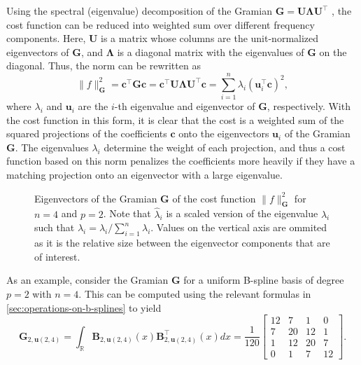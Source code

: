 Using the spectral (eigenvalue) decomposition of the Gramian $\mathbf G = \mathbf U \mathbf \Lambda \mathbf U^\top$ \citep{horn2013positive}, the cost function can be reduced into weighted sum over different frequency components. Here, $\mathbf U$ is a matrix whose columns are the unit-normalized eigenvectors of $\mathbf G$, and $\mathbf \Lambda$ is a diagonal matrix with the eigenvalues of $\mathbf G$ on the diagonal. Thus, the norm can be rewritten as
\begin{equation}\label{eq:cost-function-spectral-decomposition}
    \|f\|_\mathbf G^2 = \mathbf c^\top \mathbf G \mathbf c = \mathbf c^\top \mathbf U \mathbf \Lambda \mathbf U^\top \mathbf c = \sum_{i=1}^{n} \lambda_i (\mathbf u_i^\top \mathbf c)^2,
\end{equation}
where $\lambda_i$ and $\mathbf u_i$ are the $i$-th eigenvalue and eigenvector of $\mathbf G$, respectively. With the cost function in this form, it is clear that the cost is a weighted sum of the squared projections of the coefficients $\mathbf c$ onto the eigenvectors $\mathbf u_i$ of the Gramian $\mathbf G$. The eigenvalues $\lambda_i$ determine the weight of each projection, and thus a cost function based on this norm penalizes the coefficients more heavily if they have a matching projection onto an eigenvector with a large eigenvalue.


\begin{figure}
    \centering
        
        \caption{Eigenvectors of the Gramian $\mathbf G$ of the cost function $\|f\|_\mathbf G^2$ for $n=4$ and $p=2$. Note that $\hat\lambda_i$ is a scaled version of the eigenvalue $\lambda_i$ such that $\hat\lambda_i = \lambda_i/\sum_{i=1}^{n} \lambda_i$. Values on the vertical axis are ommited as it is the relative size between the eigenvector components that are of interest.}
        \label{fig:conservativeness-eigenvectors-integral}
\end{figure}


As an example, consider the Gramian $\mathbf G$ for a uniform B-spline basis of degree $p=2$ with $n=4$. This can be computed using the relevant formulas in \cref{sec:operations-on-b-splines} to yield
\begin{equation}
    \mathbf G_{2,\mathbf u(2,4)} = \int_\mathbb R \mathbf B_{2,\mathbf u(2,4)}(x) \mathbf B_{2,\mathbf u(2,4)}^\top(x) dx = 
    \frac{1}{120}\begin{bmatrix}
        12 & 7 & 1 & 0 \\
        7 & 20 & 12 & 1 \\
        1 & 12 & 20 & 7 \\
        0 & 1 & 7 & 12
    \end{bmatrix}.
\end{equation}

